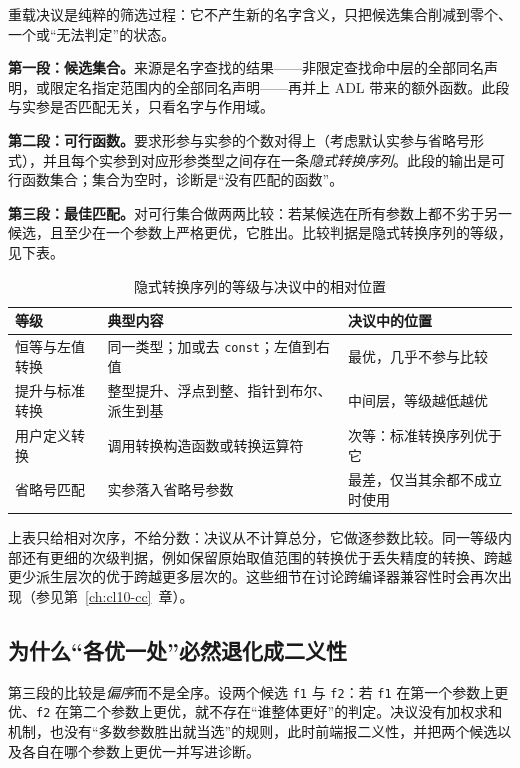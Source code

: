 \documentclass[12pt,a4paper,fontset=fandol]{ctexbook}
\newcommand{\Tp}[1]{\texttt{#1}}
\begin{document}
重载决议是纯粹的筛选过程：它不产生新的名字含义，只把候选集合削减到零个、一个或“无法判定”的状态。

\textbf{第一段：候选集合。}来源是名字查找的结果——非限定查找命中层的全部同名声明，或限定名指定范围内的全部同名声明——再并上 ADL 带来的额外函数。此段与实参是否匹配无关，只看名字与作用域。

\textbf{第二段：可行函数。}要求形参与实参的个数对得上（考虑默认实参与省略号形式），并且每个实参到对应形参类型之间存在一条\emph{隐式转换序列}。此段的输出是可行函数集合；集合为空时，诊断是“没有匹配的函数”。

\textbf{第三段：最佳匹配。}对可行集合做两两比较：若某候选在所有参数上都不劣于另一候选，且至少在一个参数上严格更优，它胜出。比较判据是隐式转换序列的等级，见下表。

\begin{table}[htbp]
\centering
\caption{隐式转换序列的等级与决议中的相对位置}
\label{tab:cl03-rank}
\begin{tabular}{>{\raggedright\arraybackslash}p{} >{\raggedright\arraybackslash}p{} >{\raggedright\arraybackslash}p{}}
\toprule
等级 & 典型内容 & 决议中的位置 \\
\midrule
恒等与左值转换 & 同一类型；加或去 \Tp{const}；左值到右值 & 最优，几乎不参与比较 \\
提升与标准转换 & 整型提升、浮点到整、指针到布尔、派生到基 & 中间层，等级越低越优 \\
用户定义转换 & 调用转换构造函数或转换运算符 & 次等：标准转换序列优于它 \\
省略号匹配 & 实参落入省略号参数 & 最差，仅当其余都不成立时使用 \\
\bottomrule
\end{tabular}
\end{table}

上表只给相对次序，不给分数：决议从不计算总分，它做逐参数比较。同一等级内部还有更细的次级判据，例如保留原始取值范围的转换优于丢失精度的转换、跨越更少派生层次的优于跨越更多层次的。这些细节在讨论跨编译器兼容性时会再次出现（参见第~\ref{ch:cl10-cc}~章）。

\subsection{为什么“各优一处”必然退化成二义性}\label{sec:cl03-ambiguity}

第三段的比较是\emph{偏序}而不是全序。设两个候选 \Tp{f1} 与 \Tp{f2}：若 \Tp{f1} 在第一个参数上更优、\Tp{f2} 在第二个参数上更优，就不存在“谁整体更好”的判定。决议没有加权求和机制，也没有“多数参数胜出就当选”的规则，此时前端报二义性，并把两个候选以及各自在哪个参数上更优一并写进诊断。
\end{document}

